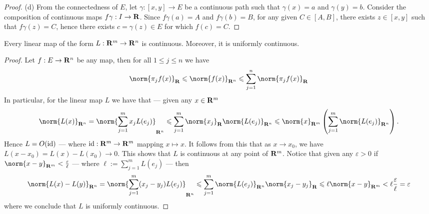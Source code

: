 \begin{proof}
(d) From the connectedness of \(E\), let \(\gamma: [x, y] \to E\) be a
continuous path such that \(\gamma(x) = a\) and \(\gamma(y) = b\). Consider
the composition of continuous maps \(f  \gamma: I \to \mathbf{R}\). Since \(f
\gamma(a) = A\) and \(f  \gamma(b) = B\), for any given \(C \in [A,
B]\), there exists \(z \in [x, y]\) such that \(f  \gamma(z) = C\), hence
there exists \(c = \gamma(z) \in E\) for which \(f(c) = C\).
\end{proof}

\begin{proposition}\label{prop: linear-continuous}
Every linear map of the form \(L: \mathbf{R}^m \to \mathbf{R}^n\) is continuous. Moreover, it
is uniformly continuous.
\end{proposition}

\begin{proof}
Let \(f: E \to \mathbf{R}^n\) be any map, then for all \(1 \leq j \leq n\) we have
\[
\norm{\pi_j  f(x)}_\R \leq \norm{f(x)}_{\R^n} \leq \sum_{j=1}^n
\norm{\pi_j  f(x)}_\R
\]
In particular, for the linear map \(L\) we have that --- given any \(x \in
\mathbf{R}^m\)
\[
\norm{L(x)}_{\R^n} = \norm{\sum_{j=1}^m x_j L(e_j)}_{\R^n}
\leq \sum_{j=1}^m \norm{x_j}_\R \norm{L(e_j)}_{\R^n}
\leq \norm{x}_{\R^m} \left( \sum_{j=1}^m \norm{L(e_j)}_{\R^n} \right).
\]
Hence \(L = O(\operatorname{id})\) --- where \(\operatorname{id}: \mathbf{R}^m \to \mathbf{R}^m\) mapping \(x \mapsto x\). It
follows from this that as \(x \to x_0\), we have \(L(x - x_0) = L(x) - L(x_0) \to
0\). This shows that \(L\) is continuous at any point of \(\mathbf{R}^m\). Notice that
given any \(\varepsilon > 0\) if \(\norm{x - y}_{\R^m} < \frac \varepsilon \ell\) --- where \(\ell :=
\sum_{j=1}^m L(e_j)\) --- then
\[
\norm{L(x) - L(y)}_{\R^n} = \norm{\sum_{j=1}^m (x_j - y_j) L(e_j) }_{\R^n}
\leq \sum_{j=1}^m \norm{L(e_j)}_{\R^n} \norm{x_j - y_j}_\R
\leq \ell \norm{x - y}_{\R^m}
< \ell \frac \varepsilon \ell = \varepsilon
\]
where we conclude that \(L\) is uniformly continuous.
\end{proof}
